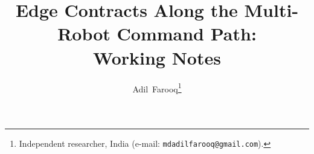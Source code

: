 \documentclass[journal,onecolumn]{IEEEtran}
\title{Edge Contracts Along the Multi-Robot Command Path:\\
  Working Notes}
\author{Adil~Farooq\thanks{Independent researcher, India
  (e-mail: \texttt{mdadilfarooq@gmail.com}).}}
\begin{document}
\maketitle







\FloatBarrier


\end{document}
